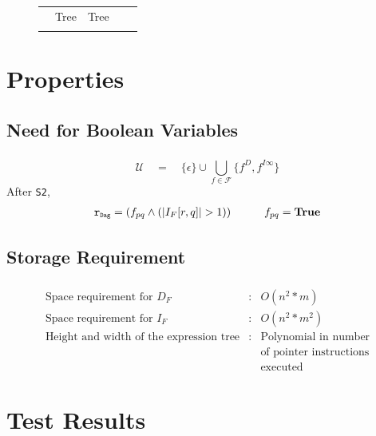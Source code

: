 \documentclass[mathserif,10pt]{beamer}
\newcommand{\epsilonset}{\ensuremath{\{\epsilon\}}}
\newcommand{\upath}{\ensuremath{\mathcal{U}}}
\newcommand{\mb}[1]{\mbox{{\tt #1}}}
\newcommand{\Dag}{{\tt Dag}}
\newcommand{\drct}{\ensuremath{D}}
\newcommand{\indrct}{\ensuremath{I}}
\newcommand{\fields}{\ensuremath{\mathcal{F}}}
\newcommand{\IFM}[2]{\ensuremath{I_F[#1,#2]}}
\newcommand{\subD}{\mbox{\scalebox{0.6}{\Dag}}}
\newcommand{\true}{\textbf{True}}
\begin{document}
{\begin{figure}
\begin{center}
{\begin{tabular}{ |@{}l@{ }|@{}c@{}|@{}c@{}|@{}c@{}|@{}c@{}|  }
																		& Tree & Tree\\
	 &&&& \\
     \hline
    \end{tabular}}
  \end{center}
\end{figure}
}

\section{Properties}
\subsection{Need for Boolean Variables}
\frame
{
	\frametitle{\subsecname}

	
	\[ \upath \quad=\quad \epsilonset \cup \bigcup_{f\in\fields} \{f^{\drct},
f^{\indrct\infty}\} \]
	After {\tt S2},
	\begin{eqnarray*}
   \mb{r}_{\subD} = (f_{pq} \wedge (|\IFM{r}{q}| > 1))
   	&\qquad& f_{pq} = \true
 	\end{eqnarray*}
}

\subsection{Storage Requirement}
\frame
{
	\frametitle{\subsecname}
	\begin{eqnarray*}
\mbox{Space requirement for } D_F &:&  O(n^{2}* m) \\
\mbox{Space requirement for } I_F &:& O(n^{2} * m^2) \\
\mbox{Height and width of the expression tree} &:& \mbox{Polynomial in number} \\
												&& \mbox{of pointer instructions} \\
												&& \mbox{executed}
\end{eqnarray*}
}

\section{Test Results}
\end{document}
